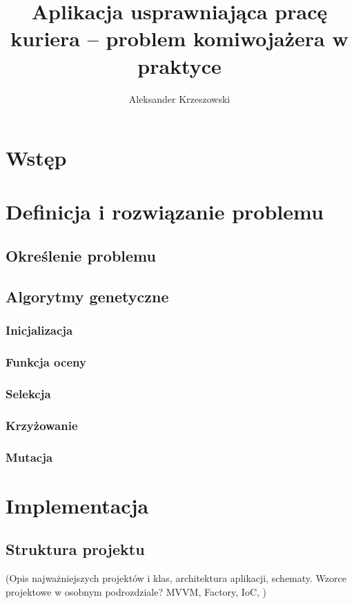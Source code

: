 \documentclass[12pt,a4paper]{report}
\begin{document}
	\author{Aleksander Krzeszowski}
	\title{Aplikacja usprawniająca pracę kuriera -- problem komiwojażera w praktyce}
	
	
	
	\tableofcontents
	
	\chapter*{Wstęp}
		
	\chapter{Definicja i rozwiązanie problemu}
		\label{ch:definicja_i_rozwiazanie}
		\section{Określenie problemu}
			
		\section{Algorytmy genetyczne}
			
		\subsection{Inicjalizacja}
			
		\subsection{Funkcja oceny}
			
		\subsection{Selekcja}
			
		\subsection{Krzyżowanie}
			
		\subsection{Mutacja}
	\chapter{Implementacja}
		\section{Struktura projektu}
			(Opis najważniejszych projektów i klas, architektura aplikacji, schematy. Wzorce projektowe w osobnym podrozdziale? MVVM, Factory, IoC, )
			
\end{document}
